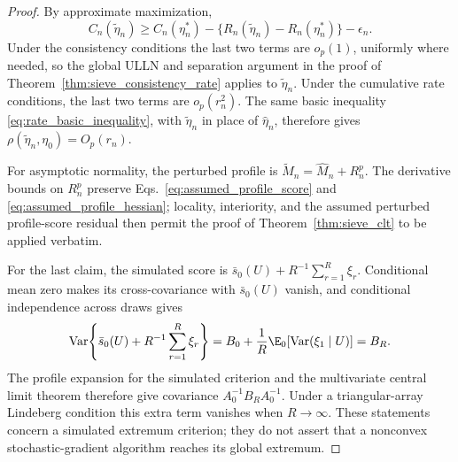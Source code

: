 \begin{proof}
By approximate maximization,
\[
 C_n(\widetilde\eta_n)
 \ge C_n(\eta_n^*)-
 \{R_n(\widetilde\eta_n)-R_n(\eta_n^*)\}-\epsilon_n.
\]
Under the consistency conditions the last two terms are $o_p(1)$, uniformly
where needed, so the global ULLN and separation argument in the proof of
Theorem~\ref{thm:sieve_consistency_rate} applies to
$\widetilde\eta_n$.  Under the cumulative rate conditions, the last two terms
are $o_p(r_n^2)$.  The same basic inequality
\eqref{eq:rate_basic_inequality}, with $\widetilde\eta_n$ in place of
$\widehat\eta_n$, therefore gives
$\rho(\widetilde\eta_n,\eta_0)=O_p(r_n)$.

For asymptotic normality, the perturbed profile is
$\widetilde M_n=\widehat M_n+R_n^p$.  The derivative bounds on $R_n^p$
preserve Eqs.~\eqref{eq:assumed_profile_score} and
\eqref{eq:assumed_profile_hessian}; locality, interiority, and the assumed
perturbed profile-score residual then permit the proof of
Theorem~\ref{thm:sieve_clt} to be applied verbatim.

For the last claim, the simulated score is
$\bar s_0(U)+R^{-1}\sum_{r=1}^R\xi_r$.  Conditional mean zero makes its
cross-covariance with $\bar s_0(U)$ vanish, and conditional independence
across draws gives
\[
 \mathrm{Var}\!\left\{\bar s_0(U)+R^{-1}\sum_{r=1}^R\xi_r\right\}
 =B_0+\frac1R\E_0[\mathrm{Var}(\xi_1\mid U)]=B_R.
\]
The profile expansion for the simulated criterion and the multivariate
central limit theorem therefore give covariance
$A_0^{-1}B_RA_0^{-1}$.  Under a triangular-array Lindeberg condition this
extra term vanishes when $R\to\infty$.  These statements concern a simulated
extremum criterion; they do not assert that a nonconvex stochastic-gradient
algorithm reaches its global extremum.
\end{proof}
